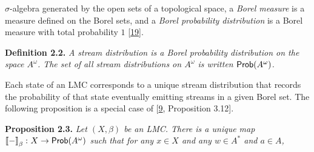 \documentclass[11pt,a4paper]{amsart}
\begin{document}
\hypertarget{html:S2.SS0.SSS0.P0.SPx2.p2.m1}{}\({\sigma}\)-algebra generated by the open sets of a topological space, a \emph{Borel measure} is a measure defined on the Borel sets, and a \emph{Borel probability distribution} is a Borel measure with total probability %
\hypertarget{html:S2.SS0.SSS0.P0.SPx2.p2.m2}{}\({1}\) [\hyperlink{html:bib.bib19}{19}].
\par\medskip
\hypertarget{html:S2.Thmtheorem2}{} \par\noindent\textbf{\textbf{Definition 2.2}\textbf{.}}\quad  %
\hypertarget{html:S2.Thmtheorem2.p1}{} \emph{A \emph{stream distribution} is a Borel probability distribution on the space %
\hypertarget{html:S2.Thmtheorem2.p1.m1}{}\({A^{\omega}}\). The set of all stream distributions on %
\hypertarget{html:S2.Thmtheorem2.p1.m2}{}\({A^{\omega}}\) is written %
\hypertarget{html:S2.Thmtheorem2.p1.m3}{}\({\text{\sf Prob}(A^{\omega})}\).}
\par\medskip
\hypertarget{html:S2.SS0.SSS0.P0.SPx2.p3}{} Each state of an LMC corresponds to a unique stream distribution that records the probability of that state eventually emitting streams in a given Borel set. The following proposition is a special case of [\hyperlink{html:bib.bib9}{9}, Proposition 3.12].
\par\medskip
\hypertarget{html:S2.Thmtheorem3}{} \par\noindent\textbf{\textbf{Proposition 2.3}\textbf{.}}\quad  %
\hypertarget{html:S2.Thmtheorem3.p1}{} \emph{Let %
\hypertarget{html:S2.Thmtheorem3.p1.m1}{}\({(X,\beta)}\) be an LMC. There is a unique map %
\hypertarget{html:S2.Thmtheorem3.p1.m2}{}\({\left\llbracket{-}\right\rrbracket_{\beta}\colon X\to\text{\sf Prob}(A^{\omega})}\) such that for any %
\hypertarget{html:S2.Thmtheorem3.p1.m3}{}\({x\in X}\) and any %
\hypertarget{html:S2.Thmtheorem3.p1.m4}{}\({w\in A^{*}}\) and %
\hypertarget{html:S2.Thmtheorem3.p1.m5}{}\({a\in A}\),}
\par\medskip
\hypertarget{html:S2.Ex2}{}   %
\end{document}
